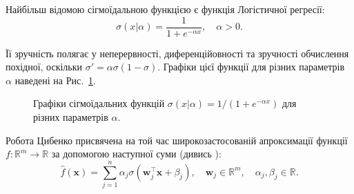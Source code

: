 \begin{example}
	Найбільш відомою сігмоїдальною функцією є функція Логістичної регресії:
	\begin{equation}
		\sigma(x|\alpha) = \frac{1}{1+e^{-\alpha x}}, \quad \alpha > 0.
	\end{equation}

	Її зручність полягає у неперервності, диференційовності та зручності
	обчислення похідної, оскільки $\sigma' = \alpha\sigma(1-\sigma)$.
	Графіки цієї функції для різних параметрів $\alpha$ наведені на
	Рис.~\ref{fig:sigmoids}.
\end{example}

\begin{figure}
\centering
{}
\caption{Графіки сігмоїдальних функцій $\sigma(x|\alpha)=1/(1+e^{-\alpha x})$ для різних параметрів $\alpha$.}
\label{fig:sigmoids}
\end{figure}

Робота Цибенко присвячена на той час широкозастосованій апроксимації функції $f:
\mathbb{R}^m \to \mathbb{R}$ за допомогою наступної суми (дивись
\cite{old-nets}):
\begin{equation}\label{eq:cybenko-g}
	\widehat{f}(\mathbf{x}) = \sum_{j=1}^n \alpha_j \sigma(\boldsymbol{w}_j^{\top}\mathbf{x} + \beta_j), \quad \boldsymbol{w}_j \in \mathbb{R}^m, \quad \alpha_j,\beta_j \in \mathbb{R}.
\end{equation}

